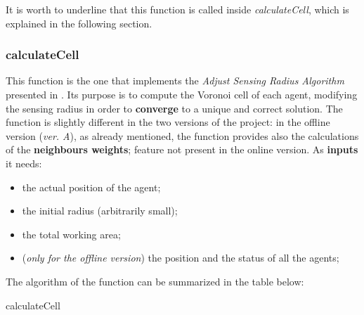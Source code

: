 \documentclass[a4paper,11pt,oneside]{book}
\makeatletter
\def\BState{\State\hskip-\ALG@thistlm}
\makeatother
\begin{document}
It is worth to underline that this function is called inside \textit{calculateCell}, which is explained in the following section.

\subsubsection{calculateCell}
	This function is the one that implements the \textit{Adjust Sensing Radius Algorithm} presented in \cite{K1}. Its purpose is to compute the Voronoi cell of each agent, modifying the sensing radius in order to \textbf{converge} to a unique and correct solution. The function is slightly different in the two versions of the project: in the offline version (\textit{ver. A}), as already mentioned, the function provides also the calculations of the \textbf{neighbours weights}; feature not present in the online version.
	 As \textbf{inputs} it needs:
	 \begin{itemize}
	 	\item the actual position of the agent;
		\item the initial radius (arbitrarily small);
		\item the total working area;
		\item (\textit{only for the offline version}) the position and the status of all the agents;
	\end{itemize}
The algorithm of the function can be summarized in the table below:
\begin{algorithm}[H]
\caption{calculateCell}\label{euclid}
\end{algorithm}
\end{document}
